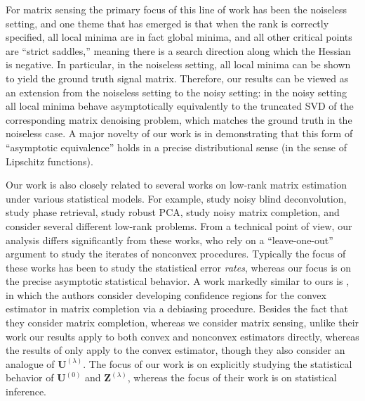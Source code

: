 \documentclass[10pt]{article}
\theoremstyle{definition}
\begin{document}
For matrix sensing the primary focus of this line of work has been the noiseless setting, and one theme that has emerged is that  when the rank is correctly specified, all local minima are in fact global minima, and all other critical points are ``strict saddles,'' meaning there is a search direction along which the Hessian is negative. In particular, in the noiseless setting, all local minima can be shown to yield the ground truth signal matrix.  Therefore, 
our results can be viewed as an extension from the noiseless setting to the noisy setting: in the noisy setting all local minima behave asymptotically equivalently to the truncated SVD of the corresponding matrix denoising problem, which matches the ground truth in the noiseless case.    A major novelty of our work is in demonstrating that this form of ``asymptotic equivalence'' holds in a precise distributional sense (in the sense of Lipschitz functions).
 
Our work is also closely related to several works on low-rank matrix estimation under various statistical models.  For example, \citet{chen_convex_2021} study noisy blind deconvolution, \citet{candes_phase_2015,chen_gradient_2019,cai_optimal_2016} study phase retrieval, \citet{chen_bridging_2021} study robust PCA, \citet{chen_noisy_2020} study noisy matrix completion, and \citet{ma_implicit_2020,charisopoulos_low-rank_2021} consider several different low-rank problems.  From a technical point of view, our analysis differs significantly from these works, who rely on a ``leave-one-out'' argument to study the iterates of nonconvex procedures. Typically the focus of these works has been to study the statistical error \emph{rates}, whereas our focus is on the precise asymptotic statistical behavior.  A work markedly similar to ours is  \citet{chen_inference_2019}, in which the authors consider developing confidence regions for the convex estimator in matrix completion via a debiasing procedure.  Besides the fact that they consider matrix completion, whereas we consider matrix sensing, unlike their work our results apply to both convex and nonconvex estimators directly, whereas the results of  \citet{chen_inference_2019} only apply to the convex estimator, though they also consider an analogue of $\bm{U}^{(\lambda)}$.  The focus of our work is on explicitly studying the statistical behavior of $\bm{U}^{(0)}$ and $\bm{Z}^{(\lambda)}$, whereas the focus of their work is on statistical inference.  
\end{document}
